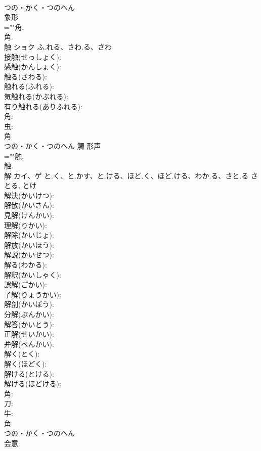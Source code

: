 \documentclass[8pt]{extreport}
\begin{document}
\begin{CJK}{UTF8}{min}
\\	つの・かく・つのへん	
\\	象形 
\\	=""角.
\\	角.
\\	触	ショク	ふ.れる、さわ.る、さわ		
\\	接触(せっしょく): 
\\	感触(かんしょく): 
\\	触る(さわる): 
\\	触れる(ふれる): 
\\	気触れる(かぶれる): 
\\	有り触れる(ありふれる): 
\\	角: 
\\	虫: 
\\	角	
\\	つの・かく・つのへん	觸	形声 
\\	=""触.
\\	触.
\\	解	カイ、ゲ	と.く、と.かす、と.ける、ほど.く、ほど.ける、わか.る、さと.る	さとる, とけ	
\\	解決(かいけつ): 
\\	解散(かいさん): 
\\	見解(けんかい): 
\\	理解(りかい): 
\\	解除(かいじょ): 
\\	解放(かいほう): 
\\	解説(かいせつ): 
\\	解る(わかる): 
\\	解釈(かいしゃく): 
\\	誤解(ごかい): 
\\	了解(りょうかい): 
\\	解剖(かいぼう): 
\\	分解(ぶんかい): 
\\	解答(かいとう): 
\\	正解(せいかい): 
\\	弁解(べんかい): 
\\	解く(とく): 
\\	解く(ほどく): 
\\	解ける(とける): 
\\	解ける(ほどける): 
\\	角: 
\\	刀: 
\\	牛: 
\\	角	
\\	つの・かく・つのへん	
\\	会意 

\end{CJK}
\end{document}
